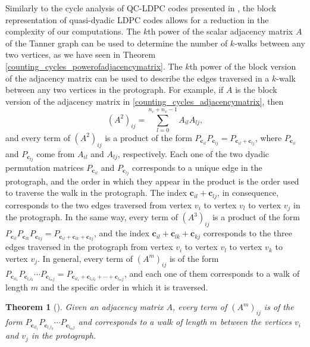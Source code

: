 \documentclass[11pt]{article}
\newtheorem{theorem}[lemma]{Theorem}
\theoremstyle{plain}
\theoremstyle{plain}
\theoremstyle{definition}
\numberwithin{theo}{section}
\newcommand{\bc}{{\mathbf c}}
\newcounter{alp}
\newcounter{rom}
\begin{document}
{Similarly to the cycle analysis of QC-LDPC codes presented in \cite{gfsm23c}, the block representation of quasi-dyadic LDPC codes allows for a reduction in the complexity of our computations. 
The $k$th power of the scalar adjacency matrix $A$ of the Tanner graph can be used to determine the number of $k$-walks between any two vertices, as we have seen in Theorem \ref{counting_cycles_powerofadjacencymatrix}. The $k$th power of the block version of the adjacency matrix can be used to describe the edges traversed in a $k$-walk between any two vertices in the protograph. For example, if $A$ is the block version of the adjacency matrix in \eqref{counting_cycles_adjacencymatrix}, then
\begin{equation*}
\label{counting_cycles_dyadics_polynomialsquareofA}
{(A^2)}_{ij}=\displaystyle \sum_{l=0}^{n_c+n_v-1}A_{il}A_{lj},
\end{equation*}
and every term of ${(A^2)}_{ij}$ is a product of the form $P_{\bc_{il}}P_{\bc_{lj}}=P_{\bc_{il}+\bc_{lj}}$, where $P_{\bc_{il}}$ and $P_{\bc_{lj}}$ come from $A_{il}$ and $A_{lj}$, respectively. Each one of the two dyadic permutation matrices $P_{\bc_{il}}$ and $P_{\bc_{lj}}$ corresponds to a unique edge in the protograph, and the order in which they appear in the product is the order used to traverse the walk in the protograph. The index $\bc_{il}+\bc_{lj}$, in consequence, corresponds to the two edges traversed from vertex $v_i$ to vertex $v_l$ to vertex $v_j$ in the protograph. In the same way, every term of ${(A^3)}_{ij}$ is a product of the form $P_{\bc_{il}}P_{\bc_{lk}}P_{\bc_{kj}}=P_{\bc_{il}+\bc_{lk}+\bc_{kj}}$, and the index $\bc_{il}+\bc_{lk}+\bc_{kj}$ corresponds to the three edges traversed in the protograph from vertex $v_i$ to vertex $v_l$ to vertex $v_k$ to vertex $v_j$. In general, every term of ${(A^m)}_{ij}$ is of the form $P_{\bc_{il_1}}P_{\bc_{l_1l_2}}\cdots P_{\bc_{l_mj}}=P_{\bc_{il_1}+\bc_{l_1l_2}+\cdots+\bc_{l_mj}}$, and each one of them corresponds to a walk of length $m$ and the specific order in which it is traversed.

\begin{theorem}[]
\label{counting_cycles_dyadics_polynomialpowerofadjacencymatrix}
Given an adjacency matrix $A$, every term of ${(A^m)}_{ij}$ is of the form $P_{\bc_{il_1}}P_{\bc_{l_1l_2}}\cdots P_{\bc_{l_mj}}$ and corresponds to a walk of length $m$ between the vertices $v_i$ and $v_j$ in the protograph.
\end{theorem}

}
\end{document}
